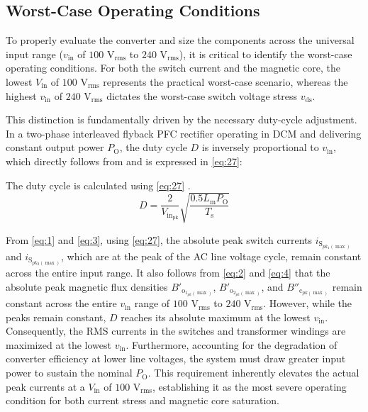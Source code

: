 \documentclass[lettersize,journal]{IEEEtran}
\begin{document}
\subsection{Worst-Case Operating Conditions}
To properly evaluate the converter and size the components across the universal input range ($v_{\text{in}}$ of $100\text{ V}_{\text{rms}}$ to $240\text{ V}_{\text{rms}}$), it is critical to identify the worst-case operating conditions. For both the switch current and the magnetic core, the lowest $V_{\text{in}}$ of $100\text{ V}_{\text{rms}}$ represents the practical worst-case scenario, whereas the highest $v_{\text{in}}$ of $240\text{ V}_{\text{rms}}$ dictates the worst-case switch voltage stress $v_{\text{ds}}$.

This distinction is fundamentally driven by the necessary duty-cycle adjustment. In a two-phase interleaved flyback PFC rectifier operating in DCM and delivering constant output power $P_{\text{O}}$, the duty cycle $D$ is inversely proportional to $v_{\text{in}}$, which directly follows from \cite{ref8} and is expressed in \eqref{eq:27}:

The duty cycle is calculated using \eqref{eq:27} \cite{ref8}.
\begin{equation}
\label{eq:27}
D = \frac{2}{V_{\mathrm{in}_{\mathrm{pk}}}} \sqrt{\frac{0.5 L_{\mathrm{m}} P_{\mathrm{O}}}{T_{\mathrm{s}}}}
\end{equation}

From \eqref{eq:1} and \eqref{eq:3}, using \eqref{eq:27}, the absolute peak switch currents $i_{\mathrm{S}_{pk_1(\max)}}$ and $i_{\mathrm{S}_{pk_2(\max)}}$, which are at the peak of the AC line voltage cycle, remain constant across the entire input range. It also follows from \eqref{eq:2} and \eqref{eq:4} that the absolute peak magnetic flux densities $B'_{\mathrm{o}_{1_{pk}(\max)}}$, $B'_{\mathrm{o}_{2_{pk}(\max)}}$, and $B''_{\mathrm{c}_{pk(\max)}}$ remain constant across the entire $v_{\text{in}}$ range of $100\text{ V}_{\text{rms}}$ to $240\text{ V}_{\text{rms}}$. However, while the peaks remain constant, $D$ reaches its absolute maximum at the lowest $v_{\text{in}}$. Consequently, the RMS currents in the switches and transformer windings are maximized at the lowest $v_{\text{in}}$. Furthermore, accounting for the degradation of converter efficiency at lower line voltages, the system must draw greater input power to sustain the nominal $P_{\text{O}}$. This requirement inherently elevates the actual peak currents at a $V_{\text{in}}$ of $100\text{ V}_{\text{rms}}$, establishing it as the most severe operating condition for both current stress and magnetic core saturation.
\end{document}
